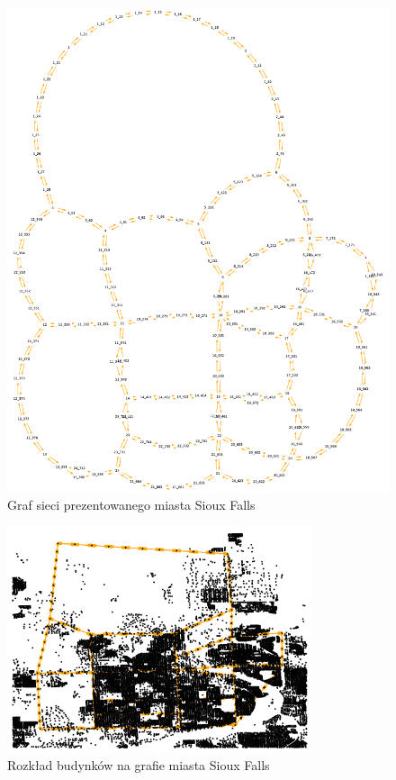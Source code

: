 \documentclass[twoside,12pt]{report}
\begin{document}
\begin{figure}[htbp]
	\centering
	\includegraphics[totalheight=0.560\textheight,angle=90]{img/sioux/network}
	\caption{Graf sieci prezentowanego miasta Sioux Falls} 
	\label{fig:siouxfalls_siec}
\end{figure}

\begin{figure}[htbp]
	\centering
	\includegraphics[width=0.8\textwidth]{img/sioux/facilities}
	\caption{Rozkład budynków na grafie miasta Sioux Falls} 
	\label{fig:siouxfalls_budynki}
\end{figure}
\end{document}
